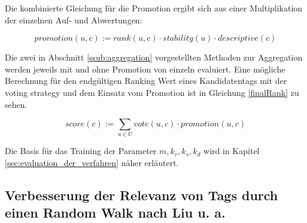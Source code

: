 Die kombinierte Gleichung für die Promotion ergibt sich aus einer Multiplikation der einzelnen Auf- und Abwertungen:
\begin{figure}[!hptb]
 \begin{equation}
 \label{combinedPromotion}
    promotion(u, c) := rank(u, c) \cdot stability(u) \cdot descriptive(c)
 \end{equation}
\end{figure}


Die zwei in Abschnitt \ref{ssub:aggregation} vorgestellten Methoden zur Aggregation werden jeweils mit und ohne Promotion von \cite{collectiveKnowledge} einzeln evaluiert. Eine mögliche Berechnung für den endgültigen Ranking Wert eines Kandidatentags mit der voting strategy und dem Einsatz vom Promotion ist in Gleichung \ref{finalRank} zu sehen.

\begin{figure}[!hptb]
 \begin{equation}
 \label{finalRank}
    score(c) :=  \sum_{u \in U} vote(u, c) \cdot promotion(u, c)
 \end{equation}
\end{figure}


Die Basis für das Training der Parameter $m,	k_r,	k_s, k_d$ wird in Kapitel \ref{sec:evaluation_der_verfahren} näher erläutert. 


\subsection{Verbesserung der Relevanz von Tags durch einen Random Walk nach Liu u. a.} %
\label{sub:verbesserung_der_relevanz_durch_einen_random_walk}

% 
% 
% 
% 

